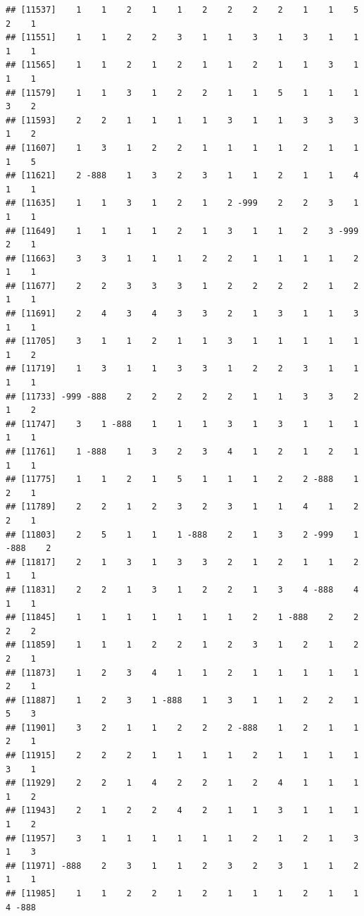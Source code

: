 \documentclass[
  12pt,
  openany]{book}
\begin{document}
\begin{verbatim}
## [11537]    1    1    2    1    1    2    2    2    2    1    1    5    2    1
## [11551]    1    1    2    2    3    1    1    3    1    3    1    1    1    1
## [11565]    1    1    2    1    2    1    1    2    1    1    3    1    1    1
## [11579]    1    1    3    1    2    2    1    1    5    1    1    1    3    2
## [11593]    2    2    1    1    1    1    3    1    1    3    3    3    1    2
## [11607]    1    3    1    2    2    1    1    1    1    2    1    1    1    5
## [11621]    2 -888    1    3    2    3    1    1    2    1    1    4    1    1
## [11635]    1    1    3    1    2    1    2 -999    2    2    3    1    1    1
## [11649]    1    1    1    1    2    1    3    1    1    2    3 -999    2    1
## [11663]    3    3    1    1    1    2    2    1    1    1    1    2    1    1
## [11677]    2    2    3    3    3    1    2    2    2    2    1    2    1    1
## [11691]    2    4    3    4    3    3    2    1    3    1    1    3    1    1
## [11705]    3    1    1    2    1    1    3    1    1    1    1    1    1    2
## [11719]    1    3    1    1    3    3    1    2    2    3    1    1    1    1
## [11733] -999 -888    2    2    2    2    2    1    1    3    3    2    1    2
## [11747]    3    1 -888    1    1    1    3    1    3    1    1    1    1    1
## [11761]    1 -888    1    3    2    3    4    1    2    1    2    1    1    1
## [11775]    1    1    2    1    5    1    1    1    2    2 -888    1    2    1
## [11789]    2    2    1    2    3    2    3    1    1    4    1    2    2    1
## [11803]    2    5    1    1    1 -888    2    1    3    2 -999    1 -888    2
## [11817]    2    1    3    1    3    3    2    1    2    1    1    2    1    1
## [11831]    2    2    1    3    1    2    2    1    3    4 -888    4    1    1
## [11845]    1    1    1    1    1    1    1    2    1 -888    2    2    2    2
## [11859]    1    1    1    2    2    1    2    3    1    2    1    2    2    1
## [11873]    1    2    3    4    1    1    2    1    1    1    1    1    2    1
## [11887]    1    2    3    1 -888    1    3    1    1    2    2    1    5    3
## [11901]    3    2    1    1    2    2    2 -888    1    2    1    1    2    1
## [11915]    2    2    2    1    1    1    1    2    1    1    1    1    3    1
## [11929]    2    2    1    4    2    2    1    2    4    1    1    1    1    2
## [11943]    2    1    2    2    4    2    1    1    3    1    1    1    1    2
## [11957]    3    1    1    1    1    1    1    2    1    2    1    3    1    3
## [11971] -888    2    3    1    1    2    3    2    3    1    1    2    1    1
## [11985]    1    1    2    2    1    2    1    1    1    2    1    1    4 -888

\end{verbatim}
\end{document}
